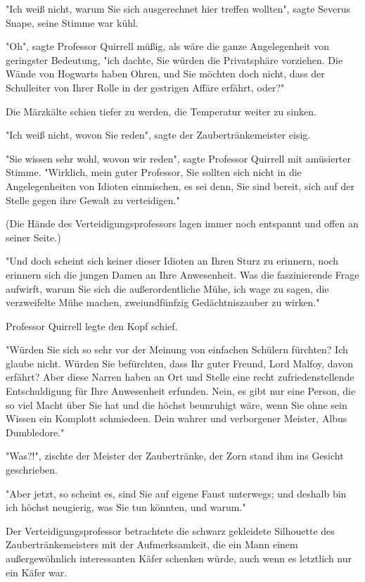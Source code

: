 {"Ich weiß nicht, warum Sie sich ausgerechnet hier treffen wollten", sagte Severus Snape, seine Stimme war kühl.

"Oh", sagte Professor Quirrell müßig, als wäre die ganze Angelegenheit von geringster Bedeutung, "ich dachte, Sie würden die Privatsphäre vorziehen. Die Wände von Hogwarts haben Ohren, und Sie möchten doch nicht, dass der Schulleiter von Ihrer Rolle in der gestrigen Affäre erfährt, oder?"

Die Märzkälte schien tiefer zu werden, die Temperatur weiter zu sinken.

"Ich weiß nicht, wovon Sie reden", sagte der Zaubertränkemeister eisig.

"Sie wissen sehr wohl, wovon wir reden", sagte Professor Quirrell mit amüsierter Stimme. "Wirklich, mein guter Professor, Sie sollten sich nicht in die Angelegenheiten von Idioten einmischen, es sei denn, Sie sind bereit, sich auf der Stelle gegen ihre Gewalt zu verteidigen."

(Die Hände des Verteidigungsprofessors lagen immer noch entspannt und offen an seiner Seite.)

"Und doch scheint sich keiner dieser Idioten an Ihren Sturz zu erinnern, noch erinnern sich die jungen Damen an Ihre Anwesenheit. Was die faszinierende Frage aufwirft, warum Sie sich die außerordentliche Mühe, ich wage zu sagen, die verzweifelte Mühe machen, zweiundfünfzig Gedächtniszauber zu wirken."

Professor Quirrell legte den Kopf schief.

"Würden Sie sich so sehr vor der Meinung von einfachen Schülern fürchten? Ich glaube nicht. Würden Sie befürchten, dass Ihr guter Freund, Lord Malfoy, davon erfährt? Aber diese Narren haben an Ort und Stelle eine recht zufriedenstellende Entschuldigung für Ihre Anwesenheit erfunden. Nein, es gibt nur eine Person, die so viel Macht über Sie hat und die höchst beunruhigt wäre, wenn Sie ohne sein Wissen ein Komplott schmiedeen. Dein wahrer und verborgener Meister, Albus Dumbledore."

"Was?!", zischte der Meister der Zaubertränke, der Zorn stand ihm ins Gesicht geschrieben.

"Aber jetzt, so scheint es, sind Sie auf eigene Faust unterwegs; und deshalb bin ich höchst neugierig, was Sie tun könnten, und warum."

Der Verteidigungsprofessor betrachtete die schwarz gekleidete Silhouette des Zaubertränkemeisters mit der Aufmerksamkeit, die ein Mann einem außergewöhnlich interessanten Käfer schenken würde, auch wenn es letztlich nur ein Käfer war.

}
